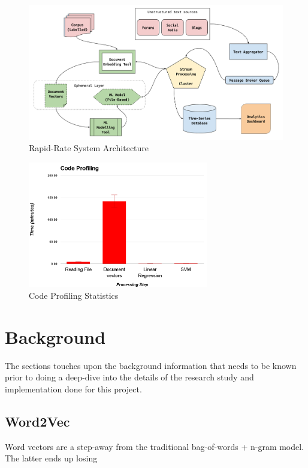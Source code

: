 \documentclass[conference]{IEEEtran}
\begin{document}
\begin{figure}[ht] \label{fig:system-architecture}
    \centering
    \includegraphics[width=\textwidth]{images/rapid_rate_system_arch_1.png}
    \caption{Rapid-Rate System Architecture}
\end{figure}

\begin{figure}[ht] \label{fig:code-profiling}
    \centering
    \includegraphics[width=0.7\textwidth]{images/code_profiling.png}
    \caption{Code Profiling Statistics}
\end{figure}

\section{Background}
    The sections touches upon the background information that needs to be known prior to doing a deep-dive into the details of the research study and implementation done for this project.

    \subsection{Word2Vec} \label{Word2Vec}
        Word vectors are a step-away from the traditional bag-of-words + n-gram model. The latter ends up losing
\end{document}
